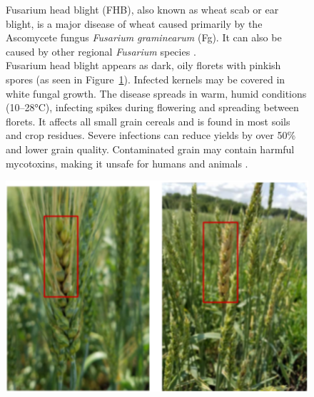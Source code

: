 \begin{figure}[H]
    \centering
    \begin{minipage}{0.55\textwidth}
        \small
        Fusarium head blight (FHB), also known as wheat scab or ear blight, is a major disease of wheat caused primarily by the Ascomycete fungus \textit{Fusarium graminearum} (Fg). It can also be caused by other regional \textit{Fusarium} species \parencite{figueroa2018review}.\\
        Fusarium head blight appears as dark, oily florets with pinkish spores (as seen in Figure~\ref{fig:Figure07}). Infected kernels may be covered in white fungal growth. The disease spreads in warm, humid conditions (10–28°C), infecting spikes during flowering and spreading between florets. It affects all small grain cereals and is found in most soils and crop residues. Severe infections can reduce yields by over 50\% and lower grain quality. Contaminated grain may contain harmful mycotoxins, making it unsafe for humans and animals \parencite{duveiller2012wheat}.
    \end{minipage}%
    \hfill
    \begin{minipage}{0.4\textwidth}
        \centering
        \includegraphics[width=0.95\linewidth]{chapters/chapter2/images/Figure07.png}
        \label{fig:Figure07}
    \end{minipage}
\end{figure}



